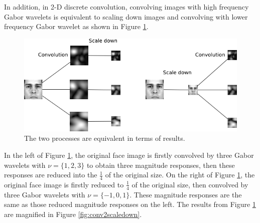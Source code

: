 In addition, in 2-D discrete convolution, convolving images with high frequency Gabor wavelets is equivalent to scaling down images and convolving with lower frequency Gabor wavelet as shown in \mbox{Figure} \ref{fig:scalingscheme}.
\begin{figure}[t]
 \begin{center}
\includegraphics[width=\columnwidth]{ch4/figures/scalingscheme.png}
  \caption{The two processes are equivalent in terms of results.}
  \label{fig:scalingscheme}
 \end{center}
\end{figure} 
In the left of \mbox{Figure} \ref{fig:scalingscheme}, the original face image is firstly convolved by three Gabor wavelets with $\nu = \{1,2,3\}$ to obtain three magnitude responses, then these responses are reduced into the $\frac{1}{4}$ of the original size. On the right of \mbox{Figure} \ref{fig:scalingscheme}, the original face image is firstly reduced to $\frac{1}{4}$ of the original size, then convolved by three Gabor wavelets with $\nu=\{-1,0,1\}$. These magnitude responses are the same as those reduced magnitude responses on the left. The results from \mbox{Figure} \ref{fig:scalingscheme} are magnified in \mbox{Figure} \ref{fig:conv2scaledown}. 
